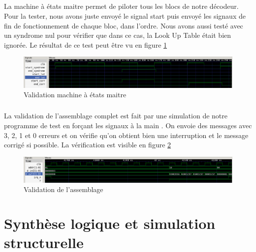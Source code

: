 \documentclass[a4paper, 11pt, svgnames]{report}
\begin{document}
            \paragraph{}
                La machine à états maitre permet de piloter tous les blocs de notre décodeur.
                Pour la tester, nous avons juste envoyé le signal start puis
                envoyé les signaux de fin de fonctionnement de chaque bloc,
                dans l'ordre. Nous avons aussi testé avec un syndrome nul pour vérifier
                que dans ce cas, la Look Up Table était bien ignorée.
                Le résultat de ce test peut être vu en figure \ref{fig:sim_master}
                \begin{figure}[H]
                    \centering
                    \includegraphics[width=\textwidth]{./images/master_simu}
                    \caption{Validation machine à états maitre}
                    \label{fig:sim_master}
                \end{figure}

            \paragraph{}
                La validation de l'assemblage complet est fait par une
                simulation de notre programme de test en forçant les signaux à
                la main .  On envoie des messages avec 3, 2, 1 et 0 erreurs et
                on vérifie qu'on obtient bien une interruption et le message
                corrigé si possible.  La vérification est visible en figure
                \ref{fig:sim_bch}

                \begin{figure}[H]
                    \centering
                    \includegraphics[width=\textwidth]{./images/bch_simu}
                    \caption{Validation de l'assemblage}
                    \label{fig:sim_bch}
                \end{figure}

    \chapter{Synthèse logique et simulation structurelle}
\end{document}
